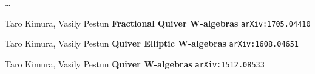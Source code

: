 \documentclass[12pt]{article}
\begin{document}
\noindent \dots 

\vfill

\begin{thebibliography}{}

\item Taro Kimura, Vasily Pestun \textbf{Fractional Quiver W-algebras} \texttt{arXiv:1705.04410}

\item Taro Kimura, Vasily Pestun \textbf{Quiver Elliptic W-algebras} \texttt{arXiv:1608.04651}

\item Taro Kimura, Vasily Pestun \textbf{Quiver W-algebras} \texttt{arXiv:1512.08533}






\end{thebibliography}
\end{document}
